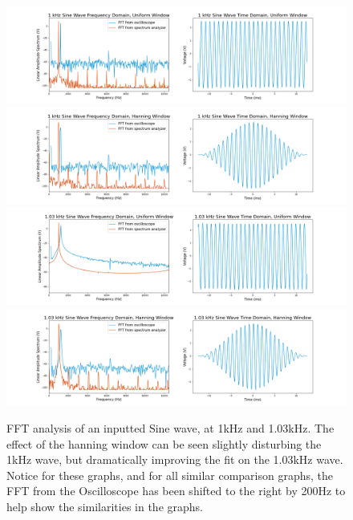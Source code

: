 \documentclass[12pt]{article}
\begin{document}
\begin{figure}[!ht]
    \centering
    \includegraphics[width=\textwidth]{1 kHz Sine Wave (uniform)}
    \includegraphics[width=\textwidth]{1 kHz Sine Wave (hanning)}
    \includegraphics[width=\textwidth]{1_03 kHz Sine Wave (uniform)}
    \label{fig:1.03_sine_uniform}
    \includegraphics[width=\textwidth]{1_03 kHz Sine Wave (hanning)}
    \caption{FFT analysis of an inputted Sine wave, at 1kHz and 1.03kHz. The effect of the hanning window can be seen slightly disturbing the 1kHz wave, but dramatically improving the fit on the 1.03kHz wave. Notice for these graphs, and for all similar comparison graphs, the FFT from the Oscilloscope has been shifted to the right by 200Hz to help show the similarities in the graphs.}
    \label{fig:sine}
\end{figure} %
\end{document}
